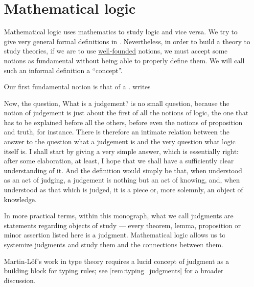 \chapter{Mathematical logic}\label{ch:mathematical_logic}

Mathematical logic uses mathematics to study logic and vice versa. We try to give very general formal definitions in . Nevertheless, in order to build a theory to study theories, if we are to use \hyperref[def:well_founded_relation]{well-founded} notions, we must accept some notions as fundamental without being able to properly define them. We will call such an informal definition a \enquote{concept}.

\begin{concept}\label{con:judgment}
  Our first fundamental notion is that of a . \Textcite[9]{MartinLöf1996LogicalLaws} writes
  \begin{displayquote}
    Now, the question, What is a judgement? is no small question, because the notion of judgement is just about the first of all the notions of logic, the one that has to be explained before all the others, before even the notions of proposition and truth, for instance. There is therefore an intimate relation between the answer to the question what a judgement is and the very question what logic itself is. I shall start by giving a very simple answer, which is essentially right: after some elaboration, at least, I hope that we shall have a sufficiently clear understanding of it. And the definition would simply be that, when understood as an act of judging, a judgement is nothing but an act of knowing, and, when understood as that which is judged, it is a piece or, more solemnly, an object of knowledge.
  \end{displayquote}
\end{concept}
\begin{comments}
  \item In more practical terms, within this monograph, what we call judgments are statements regarding objects of study --- every theorem, lemma, proposition or minor assertion listed here is a judgment. Mathematical logic allows us to systemize judgments and study them and the connections between them.

  \item Martin-L\"of's work in type theory requires a lucid concept of judgment as a building block for typing rules; see \cref{rem:typing_judgments} for a broader discussion.
\end{comments}

